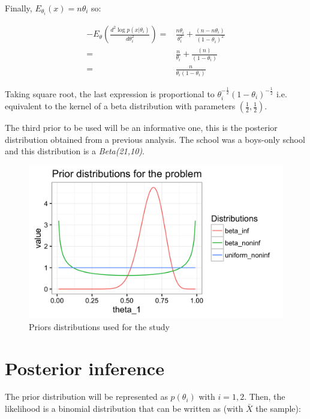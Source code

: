 \documentclass{article}
\begin{document}
Finally, $E_{\theta_i}(x) = n\theta_i$ so:

\begin{equation}
\begin{split}
	-E_\theta\left(\frac{d^2 \log p(x|\theta_i)}{d\theta_i^2}\right) =& \frac{n\theta_i}{\theta_i^2} + \frac{(n-n\theta_i)}{(1-\theta_i)^2} \\
	=& \frac{n}{\theta_i} + \frac{(n)}{(1-\theta_i)} \\
	=& \frac{n}{\theta_i(1-\theta_i)}
\end{split}
\end{equation}

\newpage

Taking square root, the last expression is proportional to $\theta_i^{-\frac{1}{2}}(1-\theta_i)^{-\frac{1}{2}}$ i.e. equivalent to the kernel of a beta distribution with parameters $(\frac{1}{2}, \frac{1}{2})$.

The third prior to be used will be an informative one, this is the posterior distribution obtained from a previous analysis. The school was a boys-only school and this distribution is a \textit{Beta(21,10)}. 

\begin{figure}[ht!]
    \centering
    \includegraphics[scale=.20]{11_Assignment1/priors_dist.png}
    \caption{Priors distributions used for the study}
    \label{fig:fig1}
\end{figure}


\section{Posterior inference}	

The prior distribution will be represented as $p(\theta_i)$ with $i = 1,2$. Then, the likelihood is a binomial distribution that can be written as (with $\bar{X}$ the sample):
\end{document}
